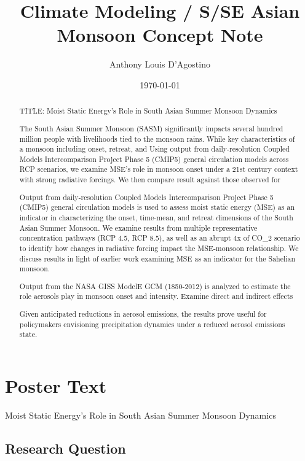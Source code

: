 \documentclass[11pt,reqno]{amsart}
\title{Climate Modeling / S/SE Asian Monsoon Concept Note}
\date{\today}
\author{Anthony Louis D'Agostino}
\begin{document}
\maketitle


\begin{abstract}
TITLE: Moist Static Energy's Role in South Asian Summer Monsoon Dynamics

The South Asian Summer Monsoon (SASM) significantly impacts several hundred million people with livelihoods tied to the monsoon rains.  While key characteristics of a monsoon including onset, retreat, and Using output from daily-resolution Coupled Models Intercomparison Project Phase 5 (CMIP5) general circulation models across RCP scenarios, we examine MSE's role in monsoon onset under a 21st century context with strong radiative forcings.           We then compare result against those observed for 


Output from daily-resolution Coupled Models Intercomparison Project Phase 5 (CMIP5) general circulation models is used to assess moist static energy (MSE) as an indicator in characterizing the onset, time-mean, and retreat dimensions of the South Asian Summer Monsoon.  We examine results from multiple representative concentration pathways (RCP 4.5, RCP 8.5), as well as an abrupt 4x of CO_2 scenario to identify how changes in radiative forcing impact the MSE-monsoon relationship.  We discuss results in light of earlier work examining MSE as an indicator for the Sahelian monsoon.    


Output from the NASA GISS ModelE GCM (1850-2012) is analyzed to estimate the role aerosols play in monsoon onset and intensity.    Examine direct and indirect effects 



 Given anticipated reductions in aerosol emissions, the results prove useful for policymakers envisioning precipitation dynamics under a reduced aerosol emissions state.  

\end{abstract}




\section{Poster Text}

Moist Static Energy's Role in South Asian Summer Monsoon Dynamics


\subsection{Research Question}
\end{document}
